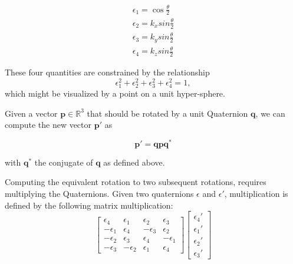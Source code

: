 \begin{eqnarray}
\epsilon_1=\cos \frac{\theta}{2}\\
\epsilon_2=k_x sin \frac{\theta}{2}\\
\epsilon_3=k_y sin \frac{\theta}{2}\\
\epsilon_4=k_z sin\frac{\theta}{2}
\end{eqnarray}

These four quantities are constrained by the relationship
\begin{equation}
\epsilon_1^2+\epsilon_2^2+\epsilon_3^2+\epsilon_4^2=1,
\end{equation}
which might be visualized by a point on a unit hyper-sphere. %

Given a vector $\mathbf{p} \in \mathbb{R}^3$ that should be rotated by a unit Quaternion $\mathbf{q}$, we can compute the new vector $\mathbf{p'}$ as

\begin{equation}
\mathbf{p'}=\mathbf{q}\mathbf{p}\mathbf{q^*}
\end{equation}

with $\mathbf{q^*}$ the conjugate of $\mathbf{q}$ as defined above.


Computing the equivalent rotation to two subsequent rotations, requires multiplying the Quaternions. Given two quaternions $\epsilon$ and $\epsilon'$, multiplication is defined by the following matrix multiplication:
\begin{equation}
\left[
\begin{array}{cccc}
\epsilon_4 & \epsilon_1 & \epsilon_2 & \epsilon_3\\
-\epsilon_1 & \epsilon_4 & -\epsilon_3 & \epsilon_2\\
-\epsilon_2 & \epsilon_3 & \epsilon_4 & -\epsilon_1\\
-\epsilon_3 & -\epsilon_2 & \epsilon_1 & \epsilon_4
\end{array}
\right]
\left[\begin{array}{c}\epsilon_4'\\\epsilon_1'\\\epsilon_2'\\\epsilon_3'\end{array}\right]
\end{equation}

